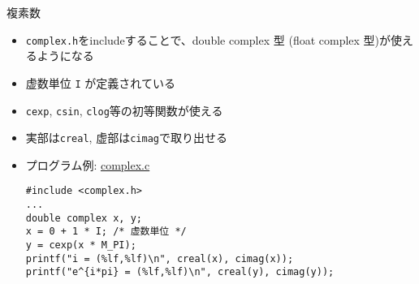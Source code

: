 \begin{frame}[t,fragile]{複素数}
  \begin{itemize}
  \item {\tt complex.h}をincludeすることで、double complex 型 (float complex 型)が使えるようになる
  \item 虚数単位 {\tt I} が定義されている
  \item {\tt cexp}, {\tt csin}, {\tt clog}等の初等関数が使える
  \item 実部は{\tt creal}, 虚部は{\tt cimag}で取り出せる
  \item プログラム例: \href{https://github.com/todo-group/computer-experiments/blob/master/exercise/basics/complex.c}{complex.c}
\begin{lstlisting}
#include <complex.h>
...
double complex x, y;
x = 0 + 1 * I; /* 虚数単位 */
y = cexp(x * M_PI);
printf("i = (%lf,%lf)\n", creal(x), cimag(x));
printf("e^{i*pi} = (%lf,%lf)\n", creal(y), cimag(y));
\end{lstlisting}
  \end{itemize}
\end{frame}
